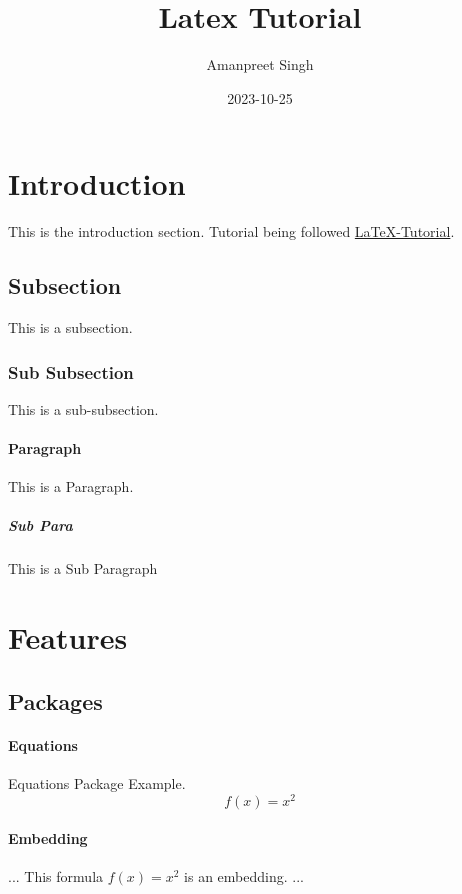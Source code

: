 \documentclass{article}[a4paper,12pt]
\title{Latex Tutorial}
\date{2023-10-25}
\author{Amanpreet Singh}
\begin{document}
  \maketitle %
  \tableofcontents
  \newpage %

\section{Introduction}
This is the introduction section.
Tutorial being followed \href{http://www.latex-tutorial.com}{LaTeX-Tutorial}.

\subsection{Subsection}
This is a subsection.  

\subsubsection{Sub Subsection}
This is a sub-subsection.

\paragraph{Paragraph} 
This is a Paragraph.

\subparagraph{Sub Para}
This is a Sub Paragraph

\section{Features}

\subsection{Packages}

\paragraph{Equations}
Equations Package Example.
\begin{equation}
  f(x) = x^2
\end{equation}

\paragraph{Embedding}

...
This formula $f(x) = x^2$ is an embedding.
...
\end{document}
